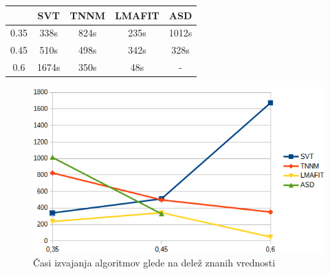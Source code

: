 \begin{table}[h]
    \centering
    \begin{tabular}{|c|c|c|c|c|}
    \hline
    & SVT & TNNM & LMAFIT & ASD \\ \hline
    0.35 & 338s & 824s & 235s & 1012s \\ \hline
    0.45 & 510s & 498s & 342s & 328s\\ \hline
    0.6 & 1674s & 350s & 48s & - \\ \hline
    \end{tabular}
\end{table}
\begin{figure}[!ht]
    \centering
    \includegraphics[width=\linewidth]{Poglavja/Slike/grayscale1000/grafCas.png}
    \caption{Časi izvajanja algoritmov glede na delež znanih vrednosti}
\end{figure}

